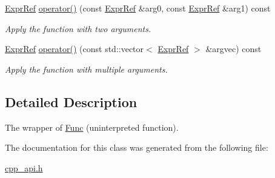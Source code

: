 \begin{DoxyCompactItemize}
\mbox{\label{classilang_1_1_func_ref_abadaf087e80056c6793dd75f596851b0}} 
\mbox{\hyperlink{classilang_1_1_expr_ref}{Expr\+Ref}} \mbox{\hyperlink{classilang_1_1_func_ref_abadaf087e80056c6793dd75f596851b0}{operator()}} (const \mbox{\hyperlink{classilang_1_1_expr_ref}{Expr\+Ref}} \&arg0, const \mbox{\hyperlink{classilang_1_1_expr_ref}{Expr\+Ref}} \&arg1) const
\begin{DoxyCompactList}\small\item\em Apply the function with two arguments. \end{DoxyCompactList}\item 
\mbox{\label{classilang_1_1_func_ref_a4758937b03557f922545006e7d374f66}} 
\mbox{\hyperlink{classilang_1_1_expr_ref}{Expr\+Ref}} \mbox{\hyperlink{classilang_1_1_func_ref_a4758937b03557f922545006e7d374f66}{operator()}} (const std\+::vector$<$ \mbox{\hyperlink{classilang_1_1_expr_ref}{Expr\+Ref}} $>$ \&argvec) const
\begin{DoxyCompactList}\small\item\em Apply the function with multiple arguments. \end{DoxyCompactList}\end{DoxyCompactItemize}


\subsection{Detailed Description}
The wrapper of \mbox{\hyperlink{classilang_1_1_func}{Func}} (uninterpreted function). 

The documentation for this class was generated from the following file\+:\begin{DoxyCompactItemize}
\item 
\mbox{\hyperlink{cpp__api_8h}{cpp\+\_\+api.\+h}}\end{DoxyCompactItemize}
